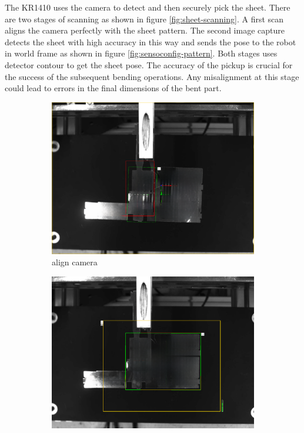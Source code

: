 The KR1410 uses the camera to detect and then securely pick the sheet. There are two stages of scanning as shown in figure \ref{fig:sheet-scanning}. A first scan aligns the camera perfectly with the sheet pattern. The second image capture detects the sheet with high accuracy in this way and sends the pose to the robot in world frame as shown in figure \ref{fig:sensoconfig-pattern}. Both stages uses detector contour to get the sheet pose.
The accuracy of the pickup is crucial for the success of the subsequent bending operations. Any misalignment at this stage could lead to errors in the final dimensions of the bent part.

\begin{figure}[h]
    \centering
    \begin{subfigure}[b]{0.48\textwidth}
        \centering
        \includegraphics[width=\textwidth]{figures/sheet-pickup/camera-align.png}
        \caption{align camera}
        \label{subfig:sheet-scan}
    \end{subfigure}\hspace{0.1cm}
    \begin{subfigure}[b]{0.48\textwidth}
        \centering
        \includegraphics[width=\textwidth]{figures/sheet-pickup/sheet-pose.png}

\end{subfigure}
\end{figure}
